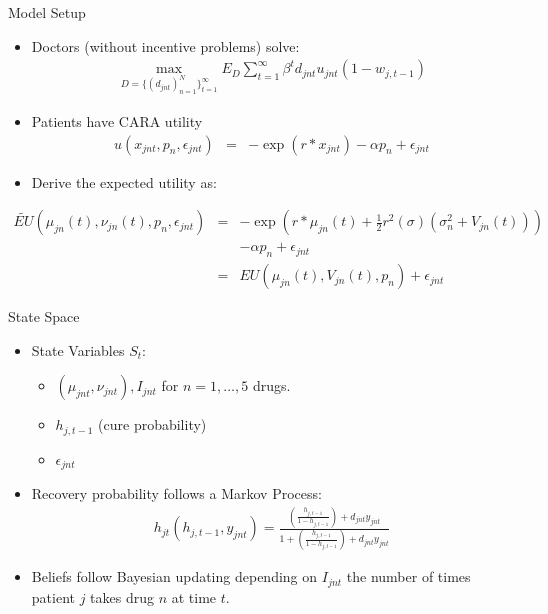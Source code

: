 \documentclass[xcolor=pdftex,dvipsnames,table,mathserif]{beamer}
\begin{document}
\begin{frame}{Model Setup}
\begin{itemize}
\item Doctors (without incentive problems) solve:
\begin{eqnarray*}
\max_{D=\{(d_{jnt})_{n=1}^N \}_{t=1}^{\infty}} E_D \sum_{t=1}^{\infty} \beta^t d_{jnt} u_{jnt}(1 - w_{j,t-1})
\end{eqnarray*}
\item Patients have CARA utility
\begin{eqnarray*}
u(x_{jnt},p_n,\epsilon_{jnt}) &=& -\exp(r *x_{jnt}) - \alpha p_n + \epsilon_{jnt}
\end{eqnarray*}
\item Derive the expected utility as:
\end{itemize}
\vspace{-0.5cm}
\begin{eqnarray*}
\tilde{EU}(\mu_{jn}(t),\nu_{jn}(t), p_n,\epsilon_{jnt}) &=& -\exp(r *\mu_{jn}(t) + \frac{1}{2} r^2(\sigma) (\sigma^2_n + V_{jn}(t))) \\
&& - \alpha p_n + \epsilon_{jnt}\\
&=& EU(\mu_{jn}(t),V_{jn}(t),p_n) + \epsilon_{jnt}
\end{eqnarray*}
\end{frame}

\begin{frame}{State Space}
\begin{itemize}
\item State Variables $S_t$:
\begin{itemize}
\item $(\mu_{jnt},\nu_{jnt}), I_{jnt}$ for $n=1,\ldots,5$ drugs.
\item $h_{j,t-1}$ (cure probability)
\item $\epsilon_{jnt}$
\end{itemize}
\item Recovery probability follows a Markov Process:
\begin{eqnarray*}
h_{jt}(h_{j,t-1},y_{jnt}) = \frac{ \left(\frac{h_{j,t-1}}{1-h_{j,t-1}} \right) + d_{jnt} y_{jnt}}  {1+ \left(\frac{h_{j,t-1}}{1-h_{j,t-1}} \right) + d_{jnt} y_{jnt}}  
\end{eqnarray*}
\item Beliefs follow Bayesian updating depending on $I_{jnt}$ the number of times patient $j$ takes drug $n$ at time $t$.
\end{itemize}
\end{frame}
\end{document}
